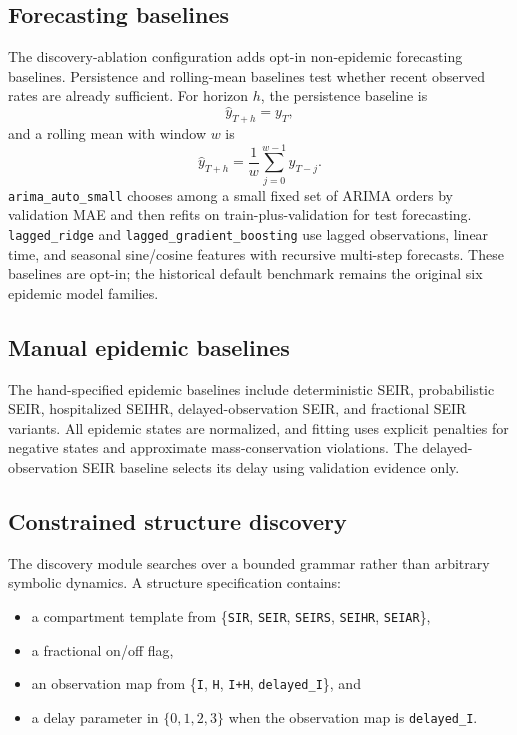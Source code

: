 \subsection{Forecasting baselines}

The discovery-ablation configuration adds opt-in non-epidemic forecasting
baselines. Persistence and rolling-mean baselines test whether recent observed
rates are already sufficient. For horizon $h$, the persistence baseline is
\[
\hat{y}_{T+h} = y_T,
\]
and a rolling mean with window $w$ is
\[
\hat{y}_{T+h} =
\frac{1}{w}\sum_{j=0}^{w-1} y_{T-j}.
\]
\texttt{arima\_auto\_small} chooses among a small fixed set of ARIMA orders by
validation MAE and then refits on train-plus-validation for test forecasting.
\texttt{lagged\_ridge} and \texttt{lagged\_gradient\_boosting} use lagged
observations, linear time, and seasonal sine/cosine features with recursive
multi-step forecasts. These baselines are opt-in; the historical default
benchmark remains the original six epidemic model families.

\subsection{Manual epidemic baselines}

The hand-specified epidemic baselines include deterministic SEIR,
probabilistic SEIR, hospitalized SEIHR, delayed-observation SEIR, and
fractional SEIR variants. All epidemic states are normalized, and fitting uses
explicit penalties for negative states and approximate mass-conservation
violations. The delayed-observation SEIR baseline selects its delay using
validation evidence only.

\subsection{Constrained structure discovery}

The discovery module searches over a bounded grammar rather than arbitrary
symbolic dynamics. A structure specification contains:
\begin{itemize}[leftmargin=1.5em]
\item a compartment template from
\{\texttt{SIR}, \texttt{SEIR}, \texttt{SEIRS}, \texttt{SEIHR}, \texttt{SEIAR}\},
\item a fractional on/off flag,
\item an observation map from
\{\texttt{I}, \texttt{H}, \texttt{I+H}, \texttt{delayed\_I}\}, and
\item a delay parameter in $\{0,1,2,3\}$ when the observation map is
\texttt{delayed\_I}.
\end{itemize}

